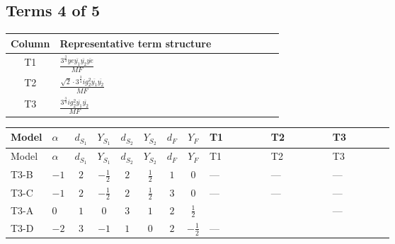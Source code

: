 \documentclass[8pt]{article}
\begin{document}
\begin{landscape}
\subsection*{Terms 4 of 5}
\begin{center}
\begin{tabular}{@{}c >{\raggedright\arraybackslash}p{0.82\linewidth}@{}}
\toprule
Column & Representative term structure \\
\midrule
T1 & \(\displaystyle \frac{3^{\frac{3}{4}} ye \overline{y_{1}} \overline{y_{2}} \overline{ye}}{MF}\) \\
\midrule
T2 & \(\displaystyle \frac{\sqrt{2} \cdot 3^{\frac{3}{4}} i g_{2}^{2} \overline{y_{1}} \overline{y_{2}}}{MF}\) \\
\midrule
T3 & \(\displaystyle \frac{3^{\frac{3}{4}} i g_{2}^{2} \overline{y_{1}} \overline{y_{2}}}{MF}\) \\
\midrule
\bottomrule
\end{tabular}
\end{center}
\smallskip
\tiny
\begin{longtable}{@{}llcccccc >{\raggedright\arraybackslash}p{0.21\linewidth} >{\raggedright\arraybackslash}p{0.21\linewidth} >{\raggedright\arraybackslash}p{0.21\linewidth}@{}}
\toprule
Model & $\alpha$ & $d_{S_1}$ & $Y_{S_1}$ & $d_{S_2}$ & $Y_{S_2}$ & $d_F$ & $Y_F$ & T1 & T2 & T3 \\
\midrule
\endfirsthead
\toprule
Model & $\alpha$ & $d_{S_1}$ & $Y_{S_1}$ & $d_{S_2}$ & $Y_{S_2}$ & $d_F$ & $Y_F$ & T1 & T2 & T3 \\
\midrule
\endhead
T3-B & $-1$ & $2$ & $-\frac{1}{2}$ & $2$ & $\frac{1}{2}$ & $1$ & $0$ & --- & --- & --- \\
\midrule
T3-C & $-1$ & $2$ & $-\frac{1}{2}$ & $2$ & $\frac{1}{2}$ & $3$ & $0$ & --- & --- & --- \\
\midrule
T3-A & $0$ & $1$ & $0$ & $3$ & $1$ & $2$ & $\frac{1}{2}$ & \scriptsize\adjustbox{max width=\linewidth}{$\begin{gathered} - \frac{3^{\frac{3}{4}} ye \overline{y_{1}} \overline{y_{2}} \overline{ye}}{12 MF}\end{gathered}$} & \scriptsize\adjustbox{max width=\linewidth}{$\begin{gathered} \frac{\sqrt{2} \cdot 3^{\frac{3}{4}} i g_{2}^{2} \overline{y_{1}} \overline{y_{2}}}{3 MF}\end{gathered}$} & --- \\
\midrule
T3-D & $-2$ & $3$ & $-1$ & $1$ & $0$ & $2$ & $-\frac{1}{2}$ & --- & \scriptsize\adjustbox{max width=\linewidth}{$\begin{gathered} - \frac{\sqrt{2} \cdot 3^{\frac{3}{4}} i g_{2}^{2} \overline{y_{1}} \overline{y_{2}}}{3 MF}\end{gathered}$} & \scriptsize\adjustbox{max width=\linewidth}{$\begin{gathered} - \frac{17 \cdot 3^{\frac{3}{4}} i g_{2}^{2} \overline{y_{1}} \overline{y_{2}}}{24 MF}\end{gathered}$} \\

\end{longtable}
\end{landscape}
\end{document}
